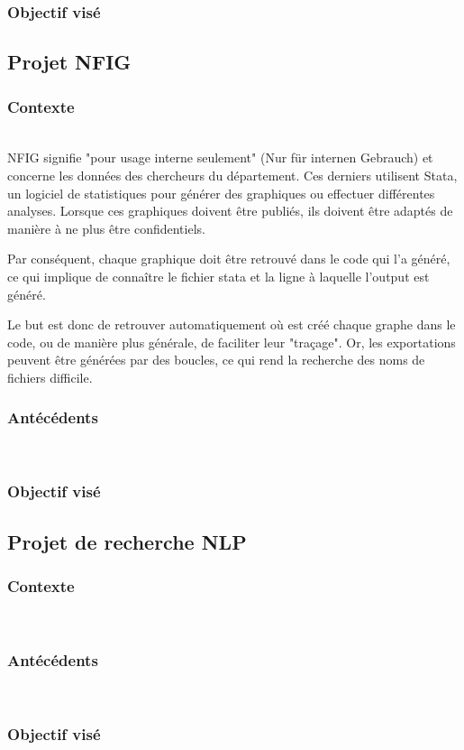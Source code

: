 \subsubsection{Objectif visé}

\pagebreak
\subsection{Projet NFIG}

\subsubsection{Contexte}
~\\
NFIG signifie "pour usage interne seulement" (Nur für internen Gebrauch) et concerne les données des chercheurs du département. 
Ces derniers utilisent Stata, un logiciel de statistiques pour générer des graphiques ou effectuer différentes analyses.
Lorsque ces graphiques doivent être publiés, ils doivent être adaptés de manière à ne plus être confidentiels.

Par conséquent, chaque graphique doit être retrouvé dans le code qui l'a généré, ce qui implique de connaître le fichier stata et la ligne à laquelle l'output est généré.

Le but est donc de retrouver automatiquement où est créé chaque graphe dans le code, ou de manière plus générale, de faciliter leur "traçage".
Or, les exportations peuvent être générées par des boucles, ce qui rend la recherche des noms de fichiers difficile.

\subsubsection{Antécédents}
~\\
\subsubsection{Objectif visé}

\pagebreak

\subsection{Projet de recherche NLP}

\subsubsection{Contexte}
~\\
\subsubsection{Antécédents}
~\\
\subsubsection{Objectif visé}
